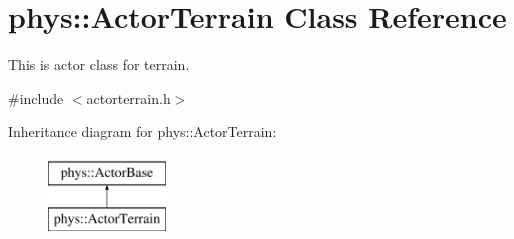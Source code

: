 \hypertarget{classphys_1_1ActorTerrain}{
\section{phys::ActorTerrain Class Reference}
\label{de/d74/classphys_1_1ActorTerrain}
}


This is actor class for terrain.  




{\ttfamily \#include $<$actorterrain.h$>$}

Inheritance diagram for phys::ActorTerrain:\begin{figure}[H]
\begin{center}
\leavevmode
\includegraphics[height=2cm]{de/d74/classphys_1_1ActorTerrain}
\end{center}
\end{figure}
